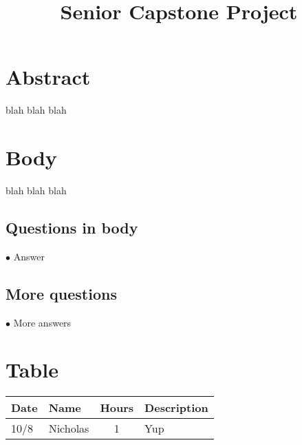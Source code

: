 \documentclass[letterpaper,10pt,fleqn,draftclsnofoot,onecolumn]{IEEEtran}
\title{Senior Capstone Project}
\author{\name}
\begin{document}
	\maketitle
	\hrulefill
	\section*{Abstract}
	blah blah blah
	
	\section*{Body}
	blah blah blah
	
	\subsection{Questions in body}
	$\bullet$ Answer
	
	\subsection{More questions}
	$\bullet$ More answers
	
	
	
	\section*{Table}
	\begin{tabular}{l l c p{1.1in}}\textbf{Date} & \textbf{Name} & \textbf{Hours} & \textbf{Description}\\\hline
		10/8 & Nicholas & 1 & Yup\\\hline

	\end{tabular}
		\nocite{*}
		
		
	
\end{document}
